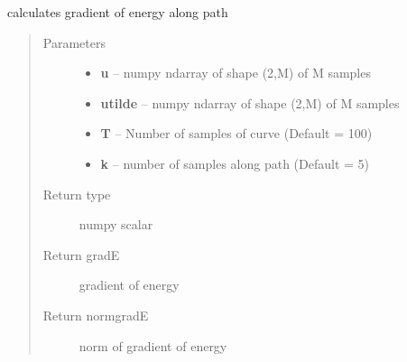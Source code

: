 \documentclass[letterpaper,10pt,english]{sphinxmanual}
\begin{document}

\begin{fulllineitems}
\label{geodesic:geodesic.calculate_gradE}
calculates gradient of energy along path
\begin{quote}\begin{description}
\item[{Parameters}] \leavevmode\begin{itemize}
\item {} 
\textbf{u} -- numpy ndarray of shape (2,M) of M samples

\item {} 
\textbf{utilde} -- numpy ndarray of shape (2,M) of M samples

\item {} 
\textbf{T} -- Number of samples of curve (Default = 100)

\item {} 
\textbf{k} -- number of samples along path (Default = 5)

\end{itemize}

\item[{Return type}] \leavevmode
numpy scalar

\item[{Return gradE}] \leavevmode
gradient of energy

\item[{Return normgradE}] \leavevmode
norm of gradient of energy

\end{description}\end{quote}

\end{fulllineitems}

\end{document}
